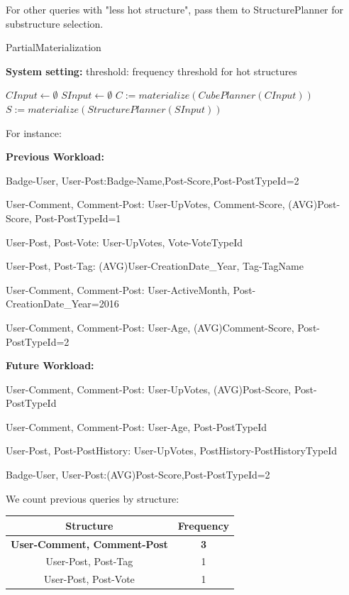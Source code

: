 For other queries with "less hot structure", pass them to StructurePlanner for substructure selection. 

\begin{algorithm}[H]
	\caption{PartialMaterialization}
	\LinesNumbered
	\textbf{System setting:} threshold: frequency threshold for hot structures\\ 
	
	$CInput \gets \emptyset$ \;
	$SInput \gets \emptyset$ \;
	$C:=materialize(CubePlanner(CInput))$ \;
	$S:=materialize(StructurePlanner(SInput))$\;
\end{algorithm}
\clearpage

For instance:

\textbf{Previous Workload:}

Badge-User, User-Post:Badge-Name,Post-Score,Post-PostTypeId=2

User-Comment, Comment-Post: User-UpVotes, Comment-Score, (AVG)Post-Score, Post-PostTypeId=1

User-Post, Post-Vote: User-UpVotes, Vote-VoteTypeId

User-Post, Post-Tag: (AVG)User-CreationDate_Year, Tag-TagName

User-Comment, Comment-Post: User-ActiveMonth, Post-CreationDate_Year=2016

User-Comment, Comment-Post: User-Age, (AVG)Comment-Score, Post-PostTypeId=2

\textbf{Future Workload:}

User-Comment, Comment-Post: User-UpVotes, (AVG)Post-Score, Post-PostTypeId

User-Comment, Comment-Post: User-Age, Post-PostTypeId

User-Post, Post-PostHistory: User-UpVotes, PostHistory-PostHistoryTypeId

Badge-User, User-Post:(AVG)Post-Score,Post-PostTypeId=2



We count previous queries by structure:

\begin{center}
	\begin{tabular}{ | c | c |}  
		\hline
		Structure	&Frequency	\\ \hline 
		\textbf{User-Comment, Comment-Post} 	&\textbf{3} \\ \hline
		User-Post, Post-Tag 	&1 \\ \hline
		User-Post, Post-Vote	&1 \\ \hline
	\end{tabular}
	\end {center}
	
